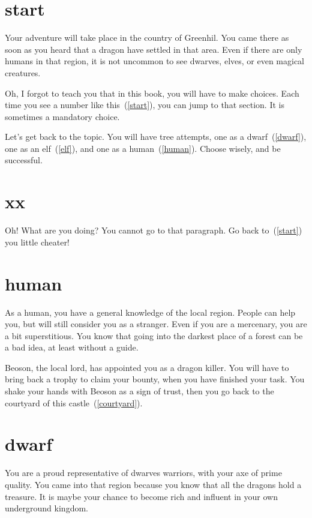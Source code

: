 \section{start}

Your adventure will take place in the country of Greenhil. You came there as soon
as you heard that a dragon have settled in that area. Even if there are only
humans in that region, it is not uncommon to see dwarves, elves, or even magical
creatures.

Oh, I forgot to teach you that in this book, you will have to make choices. Each
time you see a number like this~(\ref{start}), you can jump to that section.
It is sometimes a mandatory choice.

Let's get back to the topic. You will have tree attempts, one as a
dwarf~(\ref{dwarf}), one as an elf~(\ref{elf}), and one as a
human~(\ref{human}). Choose wisely, and be successful.

\section{xx}

Oh! What are you doing? You cannot go to that paragraph. Go back
to~(\ref{start}) you little cheater!

\section{human}

As a human, you have a general knowledge of the local region. People can help
you, but will still consider you as a stranger. Even if you are a mercenary, you
are a bit superstitious. You know that going into the darkest place of a forest
can be a bad idea, at least without a guide.

Beoson, the local lord, has appointed you as a dragon killer. You will have to bring
back a trophy to claim your bounty, when you have finished your task. You shake
your hands with Beoson as a sign of trust, then you go back to the courtyard of
this castle~(\ref{courtyard}).

\section{dwarf}

You are a proud representative of dwarves warriors, with your axe of prime
quality. You came into that region because you know that all the dragons hold a
treasure. It is maybe your chance to become rich and influent in your own
underground kingdom.

